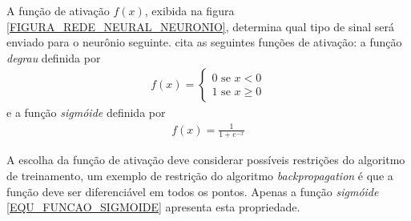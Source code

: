 A função de ativação \(f(x)\), exibida na figura \ref{FIGURA_REDE_NEURAL_NEURONIO}, determina qual tipo de sinal será enviado para o neurônio seguinte.  cita as seguintes funções de ativação: a função \emph{degrau} definida por
\begin{align}
f(x) = \begin{cases}
		0 \mbox{ se } x < 0 	 \\
		1 \mbox{ se } x \geq 0	 \label{EQU_FUNCAO_DEGRAU}				
	   \end{cases}
\end{align}
e a função \emph{sigmóide} definida por
\begin{align}
f(x) = \frac{1}{1 + e^{-x}} 	\label{EQU_FUNCAO_SIGMOIDE}
\end{align}

A escolha da função de ativação deve considerar possíveis restrições do algoritmo de treinamento, um exemplo de restrição do algoritmo \emph{backpropagation} é que a função deve ser diferenciável em todos os pontos. Apenas a função \emph{sigmóide} \eqref{EQU_FUNCAO_SIGMOIDE} apresenta esta propriedade.

